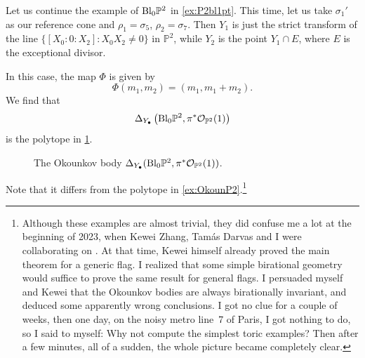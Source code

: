\begin{example}\label{ex:toric-big:L532}
    Let us continue the example of $\mathrm{Bl}_{0}\mathbb{P}^2$ in \cref{ex:P2bl1pt}. This time, let us take $\sigma_1'$ as our reference cone and $\rho_1=\sigma_5$, $\rho_2=\sigma_7$. Then $Y_1$ is just the strict transform of the line $\{[X_0:0:X_2]:X_0X_2\neq 0\}$ in $\mathbb{P}^2$, while $Y_2$ is the point $Y_1\cap E$, where $E$ is the exceptional divisor.

    In this case, the map $\Phi$ is given by
    \[
    \Phi(m_1,m_2)=(m_1,m_1+m_2).
    \]
    We find that
    \[
    \Delta_{Y_{\bullet}}\left(\mathrm{Bl}_{0}\mathbb{P}^2,\pi^*\mathcal{O}_{\mathbb{P}^2}(1)\right)
    \]
    is the polytope in \cref{fig:P2b1pOkoun}.

    \begin{figure}[ht]
        \centering
        \caption{The Okounkov body $\Delta_{Y_{\bullet}}(\mathrm{Bl}_{0}\mathbb{P}^2,\pi^*\mathcal{O}_{\mathbb{P}^2}(1))$.}
        \label{fig:P2b1pOkoun}
    \end{figure}
    Note that it differs from the polytope in \cref{ex:OkounP2}.\footnote{Although these examples are almost trivial, they did confuse me a lot at the beginning of 2023, when Kewei Zhang, Tamás Darvas and I were collaborating on \cite{DRWNXZ}. At that time, Kewei himself already proved the main theorem for a generic flag. I realized that some simple birational geometry would suffice to prove the same result for general flags.
    I persuaded myself and Kewei that the Okounkov bodies are always birationally invariant, and deduced some apparently wrong conclusions. I got no clue for a couple of weeks, then one day, on the noisy metro line~7 of Paris, I got nothing to do, so I said to myself: Why not compute the simplest toric examples? Then after a few minutes, all of a sudden, the whole picture became completely clear.}
\end{example}


